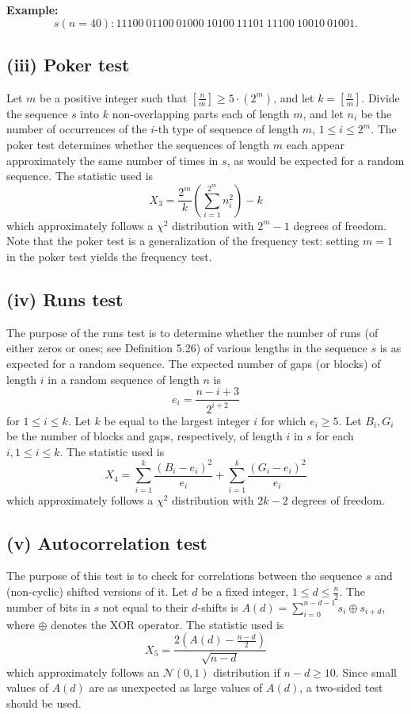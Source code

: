 \documentclass[12pt,openany]{book}
\theoremstyle{definition}
\begin{document}
\textbf{Example:}
\[ s (n=40) : 11100 \ 01100 \ 01000 \ 10100 \ 11101 \ 11100 \ 10010 \ 01001. \]

\subsection*{(iii) Poker test}
Let \( m \) be a positive integer such that \( \left[ \frac{n}{m} \right] \geq 5 \cdot (2^m) \), and let \( k = \left[ \frac{n}{m} \right] \). Divide the sequence \( s \) into \( k \) non-overlapping parts each of length \( m \), and let \( n_i \) be the number of occurrences of the \( i \)-th type of sequence of length \( m \), \( 1 \leq i \leq 2^m \). The poker test determines whether the sequences of length \( m \) each appear approximately the same number of times in \( s \), as would be expected for a random sequence. The statistic used is
\[ X_3 = \frac{2^m}{k} \left( \sum_{i=1}^{2^m} n_i^2 \right) - k \]
which approximately follows a \( \chi^2 \) distribution with \( 2^m - 1 \) degrees of freedom. Note that the poker test is a generalization of the frequency test: setting \( m = 1 \) in the poker test yields the frequency test.

\subsection*{(iv) Runs test}
The purpose of the runs test is to determine whether the number of runs (of either zeros or ones; see Definition 5.26) of various lengths in the sequence \( s \) is as expected for a random sequence. The expected number of gaps (or blocks) of length \( i \) in a random sequence of length \( n \) is
\[ e_i = \frac{n-i+3}{2^{i+2}} \]
for \( 1 \leq i \leq k \). Let \( k \) be equal to the largest integer \( i \) for which \( e_i \geq 5 \). Let \( B_i, G_i \) be the number of blocks and gaps, respectively, of length \( i \) in \( s \) for each \( i, 1 \leq i \leq k \). The statistic used is
\[ X_4 = \sum_{i=1}^{k} \frac{(B_i - e_i)^2}{e_i} + \sum_{i=1}^{k} \frac{(G_i - e_i)^2}{e_i} \]
which approximately follows a \( \chi^2 \) distribution with \( 2k - 2 \) degrees of freedom.

\subsection*{(v) Autocorrelation test}
The purpose of this test is to check for correlations between the sequence \( s \) and (non-cyclic) shifted versions of it. Let \( d \) be a fixed integer, \( 1 \leq d \leq \frac{n}{2} \). The number of bits in \( s \) not equal to their \( d \)-shifts is \( A(d) = \sum_{i=0}^{n-d-1} s_i \oplus s_{i+d} \), where \( \oplus \) denotes the XOR operator. The statistic used is
\[ X_5 = \frac{2(A(d) - \frac{n-d}{2})}{\sqrt{n-d}} \]
which approximately follows an \( \mathcal{N}(0, 1) \) distribution if \( n - d \geq 10 \). Since small values of \( A(d) \) are as unexpected as large values of \( A(d) \), a two-sided test should be used.
\end{document}
